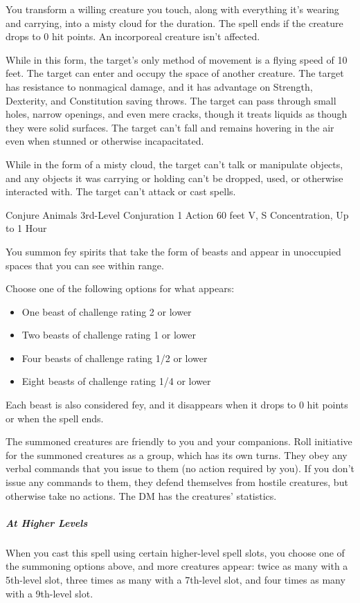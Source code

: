 {You transform a willing creature you touch, along with everything it’s wearing and carrying, into a misty cloud for the duration. The spell ends if the creature drops to 0 hit points. An incorporeal creature isn’t affected.

While in this form, the target’s only method of movement is a flying speed of 10 feet. The target can enter and occupy the space of another creature. The target has resistance to nonmagical damage, and it has advantage on Strength, Dexterity, and Constitution saving throws. The target can pass through small holes, narrow openings, and even mere cracks, though it treats liquids as though they were solid surfaces. The target can’t fall and remains hovering in the air even when stunned or otherwise incapacitated.

While in the form of a misty cloud, the target can’t talk or manipulate objects, and any objects it was carrying or holding can’t be dropped, used, or otherwise interacted with. The target can’t attack or cast spells.

\DndSpellHeader
  {Conjure Animals}
  {3rd-Level Conjuration}
  {1 Action}
  {60 feet}
  {V, S}
  {Concentration, Up to 1 Hour}

You summon fey spirits that take the form of beasts and appear in unoccupied spaces that you can see within range.

Choose one of the following options for what appears:

\begin{itemize}
	\item One beast of challenge rating 2 or lower
	\item Two beasts of challenge rating 1 or lower
	\item Four beasts of challenge rating 1/2 or lower
	\item Eight beasts of challenge rating 1/4 or lower
\end{itemize}

Each beast is also considered fey, and it disappears when it drops to 0 hit points or when the spell ends.

The summoned creatures are friendly to you and your companions. Roll initiative for the summoned creatures as a group, which has its own turns. They obey any verbal commands that you issue to them (no action required by you). If you don't issue any commands to them, they defend themselves from hostile creatures, but otherwise take no actions. The DM has the creatures' statistics.

\subparagraph*{At Higher Levels} When you cast this spell using certain higher-level spell slots, you choose one of the summoning options above, and more creatures appear: twice as many with a 5th-level slot, three times as many with a 7th-level slot, and four times as many with a 9th-level slot.

}
